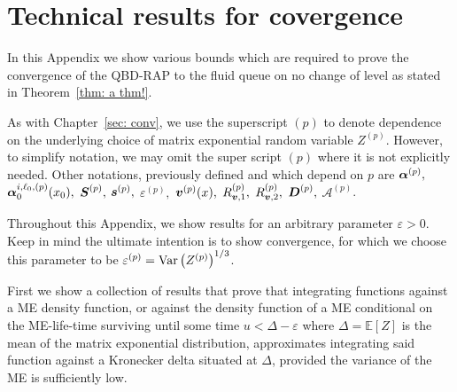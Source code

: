 \chapter{Technical results for covergence}\label{app:tand}
In this Appendix we show various bounds which are required to prove the convergence of the QBD-RAP to the fluid queue on no change of level as stated in Theorem~\ref{thm: a thm!}. %

As with Chapter~\ref{sec: conv}, we use the superscript \((p)\) to denote dependence on the underlying choice of matrix exponential random variable \(Z^{(p)}\). However, to simplify notation, we may omit the super script \((p)\) where it is not explicitly needed. Other notations, previously defined and which depend on \(p\) are \(\boldsymbol\alpha^{(p)},\) \(\boldsymbol \alpha_0^{i,\ell_0,(p)}(x_0),\) \(\boldsymbol S^{(p)},\) \(\boldsymbol s^{(p)},\) \(\varepsilon^{(p)},\) \({\boldsymbol v}^{(p)}(x),\) \(R_{{\boldsymbol v},1}^{(p)},\) \(R_{{\boldsymbol v},2}^{(p)},\) \(\boldsymbol D^{(p)},\) \( \mathcal A^{(p)}\).

Throughout this Appendix, we show results for an arbitrary parameter \(\varepsilon>0\). Keep in mind the ultimate intention is to show convergence, for which we choose this parameter to be \(\varepsilon^{(p)}=\mathrm{Var}\left(Z^{(p)}\right)^{1/3}\). 

First we show a collection of results that prove that integrating functions against a ME density function, or against the density function of a ME conditional on the ME-life-time surviving until some time \(u<\Delta-\varepsilon\) where \(\Delta = \mathbb E[Z]\) is the mean of the matrix exponential distribution, approximates integrating said function against a Kronecker delta situated at \(\Delta\), provided the variance of the ME is sufficiently low. 

